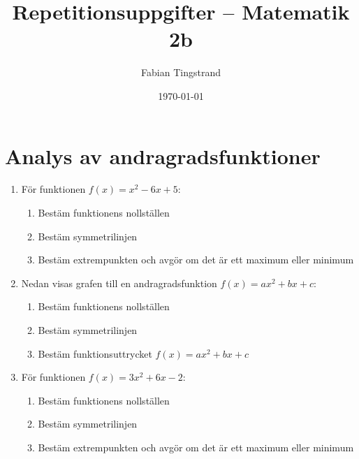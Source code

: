 \documentclass[a4paper,11pt]{article}
\title{Repetitionsuppgifter -- Matematik 2b}
\author{Fabian Tingstrand}
\date{\today}
\begin{document}
\maketitle

\section{Analys av andragradsfunktioner}

\begin{enumerate}[label=\textbf{\arabic*.}]
    \item För funktionen $f(x) = x^2 - 6x + 5$:
    \begin{enumerate}[label=\alph*)]
        \item Bestäm funktionens nollställen
        \item Bestäm symmetrilinjen
        \item Bestäm extrempunkten och avgör om det är ett maximum eller minimum
    \end{enumerate}
    
    \item Nedan visas grafen till en andragradsfunktion $f(x) = ax^2 + bx + c$:
    
    \begin{center}
    \end{center}
    
    \begin{enumerate}[label=\alph*)]
        \item Bestäm funktionens nollställen
        \item Bestäm symmetrilinjen
        \item Bestäm funktionsuttrycket $f(x) = ax^2 + bx + c$
    \end{enumerate}

    \item För funktionen $f(x) = 3x^2 + 6x - 2$:
    \begin{enumerate}[label=\alph*)]
        \item Bestäm funktionens nollställen
        \item Bestäm symmetrilinjen
        \item Bestäm extrempunkten och avgör om det är ett maximum eller minimum
    \end{enumerate}
    

\end{enumerate}
\end{document}
